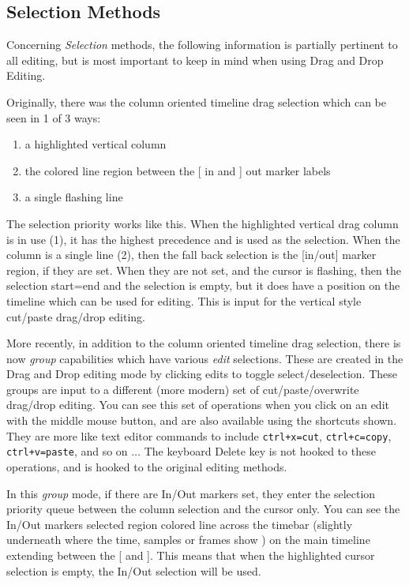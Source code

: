 \subsection{Selection Methods}%
\label{sub:selection_method}

Concerning \textit{Selection} methods, the following information is partially pertinent to all editing, but is most important to keep in mind when using Drag and Drop Editing.

Originally, there was the column oriented timeline drag selection which can be seen
in 1 of 3 ways: 

\begin{enumerate}
    \item  a highlighted vertical column
    \item  the colored line region between the [ in and ] out marker labels
    \item  a single flashing line
\end{enumerate}

The selection priority works like this. When the highlighted vertical drag column is in use (1), it has the highest precedence and is used
as the selection.  When the column is a single line (2), then the fall back
selection is the [in/out] marker region, if they are set.  When they
are not set, and the cursor is flashing, then the selection start=end
and the selection is empty, but it does have a position on the
timeline which can be used for editing.  This is input for the
vertical style cut/paste drag/drop editing.

More recently, in addition to the column oriented timeline drag selection, there is now \textit{group} 
capabilities which have various \textit{edit} selections.  These are
created in the Drag and Drop editing mode by clicking edits to toggle
select/deselection.  These groups are input to a different (more modern) set
of cut/paste/overwrite drag/drop editing.  You can see this set of
operations when you click on an edit with the middle mouse
button, and are also available using the shortcuts shown. They are more like text
editor commands to include \texttt{ctrl+x=cut}, \texttt{ctrl+c=copy}, \texttt{ctrl+v=paste}, and so on $\dots$
The keyboard Delete key is not hooked to these operations, and is hooked to the
original editing methods.

In this \textit{group} mode, if there are In/Out markers set, they enter the selection priority queue
between the column selection and the cursor only. You can see the In/Out markers selected
region colored line across the timebar (slightly underneath where the time, samples or frames show
) on the main timeline 
extending between the [ and ].  This means that when
the highlighted cursor selection is empty, the In/Out selection will be used.


